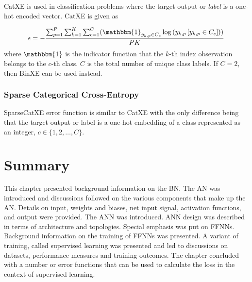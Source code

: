 \acs{CatXE} is used in classification problems where the target output or \textit{label} is a one-hot encoded vector. \acs{CatXE} is given as

\begin{equation}
      \epsilon = -\frac{\sum_{p=1}^P \sum_{k=1}^K \sum_{c=1}^C (\mathbbm{1}_{\hat{y}_{k,p} \in C_c} \log{(y_{k,p} \left[ y_{k,p} \in C_c \right])})}{PK}
      \label{eq:cat_xe}
\end{equation}
where $\mathbbm{1}$ is the indicator function that the $k$-th index observation belongs to the $c$-th class. $C$ is the total number of unique class labels. If $C = 2$, then \acs{BinXE} can be used instead.

\subsubsection{Sparse Categorical Cross-Entropy}\label{sec:anns:training:error_functions:sparse_cat_xe}

\acs{SparseCatXE} error function is similar to \acs{CatXE} with the only difference being that the target output or label is a one-hot embedding of a class represented as an integer, $c \in \{1,2, \dots, C\}$.


\section{Summary}\label{sec:anns:summary}

This chapter presented background information on the \acs{BN}. The \acs{AN} was introduced and discussions followed on the various components that make up the \acs{AN}. Details on input, weights and biases, net input signal, activation functions, and output were provided. The \acs{ANN} was introduced. \acs{ANN} design was described in terms of architecture and topologies. Special emphasis was put on \acp{FFNN}. Background information on the training of \acp{FFNN} was presented. A variant of training, called supervised learning was presented and led to discussions on datasets, performance measures and training outcomes. The chapter concluded with a number or error functions that can be used to calculate the loss in the context of supervised learning.
